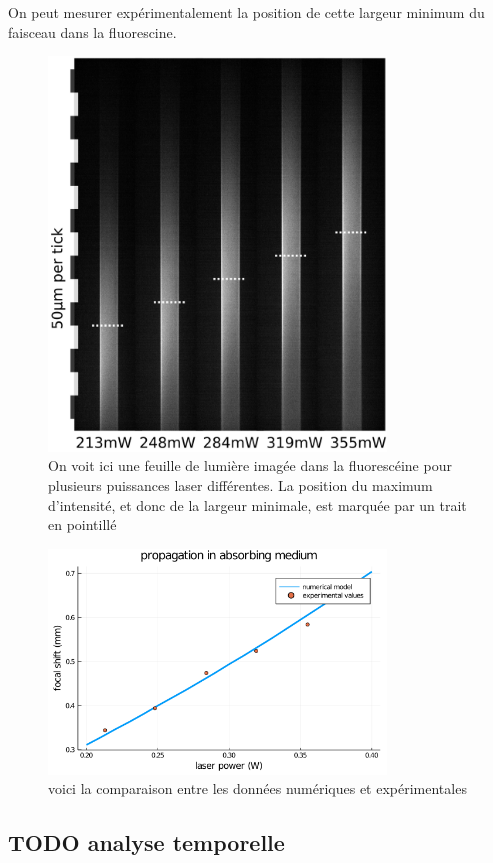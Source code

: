 On peut mesurer expérimentalement la position de cette largeur minimum du faisceau dans la fluorescine.

\begin{figure}
\centering
\includegraphics[width=0.8\textwidth]{./files/thermal-shift.svg.png}
\caption{
On voit ici une feuille de lumière imagée dans la fluorescéine pour plusieurs puissances laser différentes. La position du maximum d'intensité, et donc de la largeur minimale, est marquée par un trait en pointillé
}
\end{figure}

\begin{figure}
\centering
\includegraphics[width=0.8\textwidth]{./files/grinlensplots_model.png}
\caption{
voici la comparaison entre les données numériques et expérimentales
}
\end{figure}


\subsection{TODO analyse temporelle}
